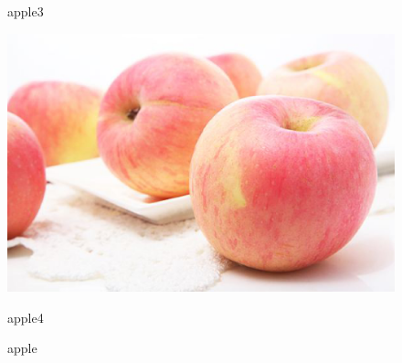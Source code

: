 \documentclass[a4paper]{article}
\begin{document}
\begin{figure}[htbp]
\begin{minipage}[b]{0.45\textwidth}
			\caption{apple3}
		\end{minipage}
	\begin{minipage}[b]{0.45\textwidth}
		\centering
		\includegraphics[scale=0.15]{apple.eps}
		\caption{apple4}
	\end{minipage}
	\caption*{apple}
	\end{figure}
\end{document}
